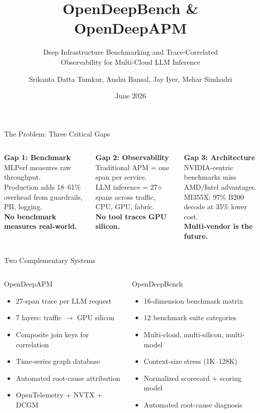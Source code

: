 \documentclass[aspectratio=169,10pt]{beamer}
\title{\textbf{OpenDeepBench \& OpenDeepAPM}}
\subtitle{Deep Infrastructure Benchmarking and Trace-Correlated\\Observability for Multi-Cloud LLM Inference}
\author{Srikanta Datta Tumkur, Anshu Bansal, Jay Iyer, Mehar Simhadri}
\institute{MIT Sloan $\cdot$ IEEE Senior Members}
\date{June 2026}
\begin{document}
\begin{frame}[plain]
\titlepage
\end{frame}

\begin{frame}{The Problem: Three Critical Gaps}
\begin{columns}[T]
\textbf{\textcolor{t4}{Gap 1: Benchmark}}\\[0.3em]
MLPerf measures raw throughput.\\
Production adds 18--61\% overhead from guardrails, PII, logging.\\
\textbf{No benchmark measures real-world.}

\textbf{\textcolor{t3}{Gap 2: Observability}}\\[0.3em]
Traditional APM = one span per service.\\
LLM inference = 27+ spans across traffic, CPU, GPU, fabric.\\
\textbf{No tool traces GPU silicon.}

\textbf{\textcolor{t2}{Gap 3: Architecture}}\\[0.3em]
NVIDIA-centric benchmarks miss AMD/Intel advantages.\\
MI355X: 97\% B200 decode at 35\% lower cost.\\
\textbf{Multi-vendor is the future.}
\end{columns}
\end{frame}

\begin{frame}{Two Complementary Systems}
\begin{columns}[T]
\begin{block}{OpenDeepAPM}
\begin{itemize}
\item 27-span trace per LLM request
\item 7 layers: traffic $\to$ GPU silicon
\item Composite join keys for correlation
\item Time-series graph database
\item Automated root-cause attribution
\item OpenTelemetry + NVTX + DCGM
\end{itemize}
\end{block}

\begin{block}{OpenDeepBench}
\begin{itemize}
\item 16-dimension benchmark matrix
\item 12 benchmark suite categories
\item Multi-cloud, multi-silicon, multi-model
\item Context-size stress (1K--128K)
\item Normalized scorecard + scoring model
\item Automated root-cause diagnosis
\end{itemize}
\end{block}
\end{columns}
\end{frame}
\end{document}
